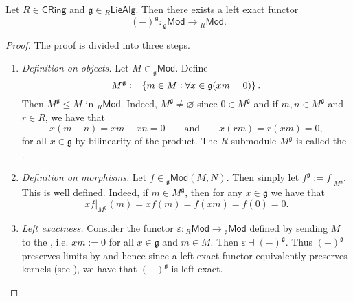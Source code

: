 \begin{proposition}
	Let $R \in \mathsf{CRing}$ and $\mathfrak{g} \in {_{R}\mathsf{LieAlg}}$. Then there exists a left exact functor
	\begin{equation*}
		(-)^\mathfrak{g} : {_{\mathfrak{g}}}\mathsf{Mod} \to {_{R}}\mathsf{Mod}.
	\end{equation*}
\end{proposition}

\begin{proof}
	The proof is divided into three steps.
	\begin{enumerate}[label = \textit{Step} \arabic*:, wide = 0pt]
		\item \textit{Definition on objects.} Let $M \in {_{\mathfrak{g}}}\mathsf{Mod}$. Define 
			\begin{equation*}
				M^\mathfrak{g} := \cbr[0]{m \in M : \forall x \in \mathfrak{g}(xm = 0)}.
			\end{equation*}
			Then $M^\mathfrak{g} \leq M$ in $_{R}\mathsf{Mod}$. Indeed, $M^\mathfrak{g} \neq \varnothing$ since $0 \in M^\mathfrak{g}$ and if $m,n \in M^\mathfrak{g}$ and $r \in R$, we have that
			\begin{equation*}
				x(m - n) = xm - xn = 0 \qquad \text{and} \qquad x(rm) = r(xm) = 0,
			\end{equation*}
			\noindent for all $x \in \mathfrak{g}$ by bilinearity of the product. The $R$-submodule $M^\mathfrak{g}$ is called the .
		\item \textit{Definition on morphisms.} Let $f \in {_\mathfrak{g}}\mathsf{Mod}(M,N)$. Then simply let $f^\mathfrak{g} := f\vert_{M^\mathfrak{g}}$. This is well defined. Indeed, if $m \in M^\mathfrak{g}$, then for any $x \in \mathfrak{g}$ we have that
			\begin{equation*}
				xf\vert_{M^\mathfrak{g}}(m) = xf(m) = f(xm) = f(0) = 0.
			\end{equation*}
		\item \textit{Left exactness.} Consider the functor $\varepsilon : {_{R}}\mathsf{Mod} \to {_{\mathfrak{g}}}\mathsf{Mod}$ defined by sending $M$ to the , i.e. $xm := 0$ for all $x \in \mathfrak{g}$ and $m \in M$. Then $\varepsilon \dashv (-)^\mathfrak{g}$. Thus $(-)^\mathfrak{g}$ preserves limits by \cite[159]{leinster:basic_category:2016} and hence since a left exact functor equivalently preserves kernels (see \cite[65]{freyd:abelian_categories:1964}), we have that $(-)^\mathfrak{g}$ is left exact.
	\end{enumerate}
\end{proof}

